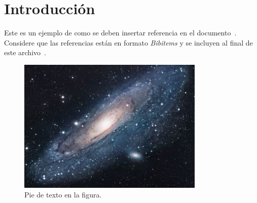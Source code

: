 \section{Introducción}


Este es un ejemplo de como se deben insertar referencia en el documento~\cite{conagua-2011}. Considere que las referencias están en formato \textit{Bibitems} y se incluyen al final de este archivo~\cite{conagua-2011,undesa2008}.


\blindtext[2]

\begin{figure}[htb]
    \centering
    \includegraphics[width=3.5in]{images/universe}
    \caption{Pie de texto en la figura.}
    \label{fig:universe}
\end{figure}

\blindtext[3]